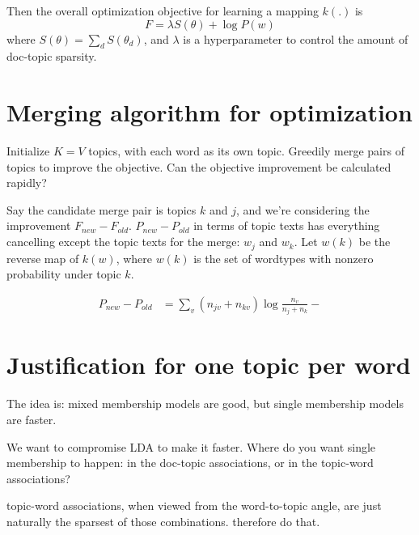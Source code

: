 \documentclass[11pt,letterpaper]{article}
\theoremstyle{definition}
\begin{document}
Then the overall optimization objective for learning a mapping $k(.)$ is
\[ F = \lambda S(\theta) + \log P(w) \]
where $S(\theta) = \sum_d S(\theta_d)$, and $\lambda$ is a hyperparameter to control the amount of doc-topic sparsity.

\section{Merging algorithm for optimization}

Initialize $K=V$ topics, with each word as its own topic.  Greedily merge pairs of topics to improve the objective.  Can the objective improvement be calculated rapidly?

Say the candidate merge pair is topics $k$ and $j$, and we're considering the improvement $F_{new}-F_{old}$.  $P_{new}-P_{old}$ in terms of topic texts has everything cancelling except the topic texts for the merge: $w_j$ and $w_k$.  Let $w(k)$ be the reverse map of $k(w)$, where $w(k)$ is the set of wordtypes with nonzero probability under topic $k$.

\begin{align}
 P_{new}-P_{old} &= \sum_v (n_{jv}+n_{kv}) \log \frac{n_v}{n_j+n_k} - 
\end{align}


\section{Justification for one topic per word}

The idea is: mixed membership models are good, but single membership models are faster.

We want to compromise LDA to make it faster.
Where do you want single membership to happen: in the doc-topic associations, or in the topic-word associations?

topic-word associations, when viewed from the word-to-topic angle, are just naturally the sparsest of those combinations.  therefore do that.

\end{document}
